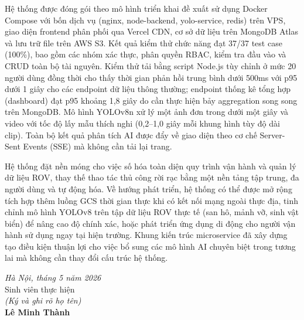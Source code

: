 \documentclass[../DoAn.tex]{subfiles}
\begin{document}
Hệ thống được đóng gói theo mô hình triển khai đề xuất sử dụng Docker Compose với bốn dịch vụ (nginx, node-backend, yolo-service, redis) trên VPS, giao diện frontend phân phối qua Vercel CDN, cơ sở dữ liệu trên MongoDB Atlas và lưu trữ file trên AWS S3. Kết quả kiểm thử chức năng đạt 37/37 test case (100\%), bao gồm các nhóm xác thực, phân quyền RBAC, kiểm tra đầu vào và CRUD toàn bộ tài nguyên. Kiểm thử tải bằng script Node.js tùy chỉnh ở mức 20 người dùng đồng thời cho thấy thời gian phản hồi trung bình dưới 500ms với p95 dưới 1 giây cho các endpoint dữ liệu thông thường; endpoint thống kê tổng hợp (dashboard) đạt p95 khoảng 1,8 giây do cần thực hiện bảy aggregation song song trên MongoDB. Mô hình YOLOv8n xử lý một ảnh đơn trong dưới một giây và video với tốc độ lấy mẫu thích nghi (0,2--1,0 giây mỗi khung hình tùy độ dài clip). Toàn bộ kết quả phân tích AI được đẩy về giao diện theo cơ chế Server-Sent Events (SSE) mà không cần tải lại trang.

Hệ thống đặt nền móng cho việc số hóa toàn diện quy trình vận hành và quản lý dữ liệu ROV, thay thế thao tác thủ công rời rạc bằng một nền tảng tập trung, đa người dùng và tự động hóa. Về hướng phát triển, hệ thống có thể được mở rộng tích hợp thêm luồng GCS thời gian thực khi có kết nối mạng ngoài thực địa, tinh chỉnh mô hình YOLOv8 trên tập dữ liệu ROV thực tế (san hô, mảnh vỡ, sinh vật biển) để nâng cao độ chính xác, hoặc phát triển ứng dụng di động cho người vận hành sử dụng ngay tại hiện trường. Khung kiến trúc microservice đã xây dựng tạo điều kiện thuận lợi cho việc bổ sung các mô hình AI chuyên biệt trong tương lai mà không cần thay đổi cấu trúc hệ thống.

\vspace{1.5cm}
\begin{flushright}
\textit{Hà Nội, tháng 5 năm 2026}\\[0.5cm]
Sinh viên thực hiện\\[0.5cm]
\textit{(Ký và ghi rõ họ tên)}\\[1cm]
\textbf{Lê Minh Thành}
\end{flushright}
\end{document}
